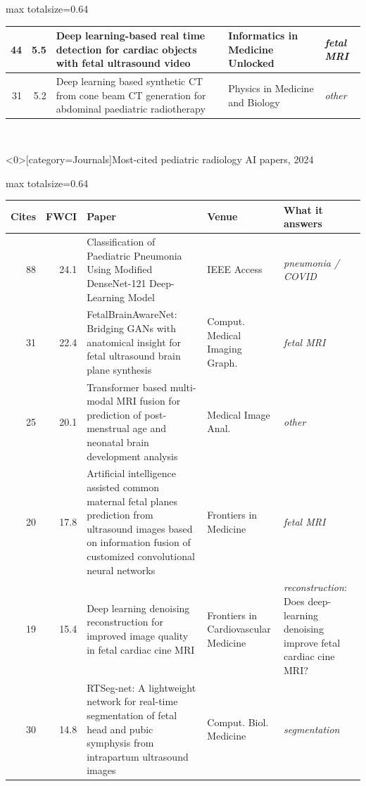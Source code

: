 \documentclass[aspectratio=169]{beamer}
\renewcommand{\arraystretch}{1.08}
\begin{document}
\begin{frame}
\begin{adjustbox}{max totalsize={\textwidth}{0.64\textheight}}
\begin{tabular}{|r|r|>{\raggedright\arraybackslash}p{}|>{\raggedright\arraybackslash}p{}|>{\raggedright\arraybackslash}p{}|}
44 & 5.5 & Deep learning-based real time detection for cardiac objects with fetal ultrasound video & Informatics in Medicine Unlocked & \textit{fetal MRI} \\ \hline
31 & 5.2 & Deep learning based synthetic CT from cone beam CT generation for abdominal paediatric radiotherapy & Physics in Medicine and Biology & \textit{other} \\ \hline
\end{tabular}
\end{adjustbox}
\\[1pt]
\end{frame}

\begin{frame}<0>[category=Journals]{Most-cited pediatric radiology AI papers, 2024}
\tiny
\begin{adjustbox}{max totalsize={\textwidth}{0.64\textheight}}
\renewcommand{\arraystretch}{1.2}
\begin{tabular}{|r|r|>{\raggedright\arraybackslash}p{}|>{\raggedright\arraybackslash}p{}|>{\raggedright\arraybackslash}p{}|}
\hline \textbf{Cites} & \textbf{FWCI} & \textbf{Paper} & \textbf{Venue} & \textbf{What it answers} \\ \hline
88 & 24.1 & Classification of Paediatric Pneumonia Using Modified DenseNet-121 Deep-Learning Model & IEEE Access & \textit{pneumonia / COVID} \\ \hline
31 & 22.4 & FetalBrainAwareNet: Bridging GANs with anatomical insight for fetal ultrasound brain plane synthesis & Comput. Medical Imaging Graph. & \textit{fetal MRI} \\ \hline
25 & 20.1 & Transformer based multi-modal MRI fusion for prediction of post-menstrual age and neonatal brain development analysis & Medical Image Anal. & \textit{other} \\ \hline
20 & 17.8 & Artificial intelligence assisted common maternal fetal planes prediction from ultrasound images based on information fusion of customized convolutional neural networks & Frontiers in Medicine & \textit{fetal MRI} \\ \hline
19 & 15.4 & Deep learning denoising reconstruction for improved image quality in fetal cardiac cine MRI & Frontiers in Cardiovascular Medicine & \textit{reconstruction}: Does deep-learning denoising improve fetal cardiac cine MRI? \\ \hline
30 & 14.8 & RTSeg-net: A lightweight network for real-time segmentation of fetal head and pubic symphysis from intrapartum ultrasound images & Comput. Biol. Medicine & \textit{segmentation} \\ \hline

\end{tabular}
\end{adjustbox}
\end{frame}
\end{document}
